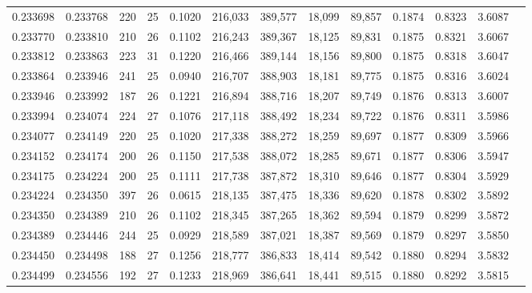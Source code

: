 \begin{tabular}{rrrrrrrrrrrrr}
0.233698 & 0.233768 &   220 &  25 &                                     0.1020 & 216,033 & 389,577 &  18,099 &  89,857 & 0.1874 & 0.8323 & 3.6087 \\
0.233770 & 0.233810 &   210 &  26 &                                     0.1102 & 216,243 & 389,367 &  18,125 &  89,831 & 0.1875 & 0.8321 & 3.6067 \\
0.233812 & 0.233863 &   223 &  31 &                                     0.1220 & 216,466 & 389,144 &  18,156 &  89,800 & 0.1875 & 0.8318 & 3.6047 \\
0.233864 & 0.233946 &   241 &  25 &                                     0.0940 & 216,707 & 388,903 &  18,181 &  89,775 & 0.1875 & 0.8316 & 3.6024 \\
0.233946 & 0.233992 &   187 &  26 &                                     0.1221 & 216,894 & 388,716 &  18,207 &  89,749 & 0.1876 & 0.8313 & 3.6007 \\
0.233994 & 0.234074 &   224 &  27 &                                     0.1076 & 217,118 & 388,492 &  18,234 &  89,722 & 0.1876 & 0.8311 & 3.5986 \\
0.234077 & 0.234149 &   220 &  25 &                                     0.1020 & 217,338 & 388,272 &  18,259 &  89,697 & 0.1877 & 0.8309 & 3.5966 \\
0.234152 & 0.234174 &   200 &  26 &                                     0.1150 & 217,538 & 388,072 &  18,285 &  89,671 & 0.1877 & 0.8306 & 3.5947 \\
0.234175 & 0.234224 &   200 &  25 &                                     0.1111 & 217,738 & 387,872 &  18,310 &  89,646 & 0.1877 & 0.8304 & 3.5929 \\
0.234224 & 0.234350 &   397 &  26 &                                     0.0615 & 218,135 & 387,475 &  18,336 &  89,620 & 0.1878 & 0.8302 & 3.5892 \\
0.234350 & 0.234389 &   210 &  26 &                                     0.1102 & 218,345 & 387,265 &  18,362 &  89,594 & 0.1879 & 0.8299 & 3.5872 \\
0.234389 & 0.234446 &   244 &  25 &                                     0.0929 & 218,589 & 387,021 &  18,387 &  89,569 & 0.1879 & 0.8297 & 3.5850 \\
0.234450 & 0.234498 &   188 &  27 &                                     0.1256 & 218,777 & 386,833 &  18,414 &  89,542 & 0.1880 & 0.8294 & 3.5832 \\
0.234499 & 0.234556 &   192 &  27 &                                     0.1233 & 218,969 & 386,641 &  18,441 &  89,515 & 0.1880 & 0.8292 & 3.5815 \\

\end{tabular}
